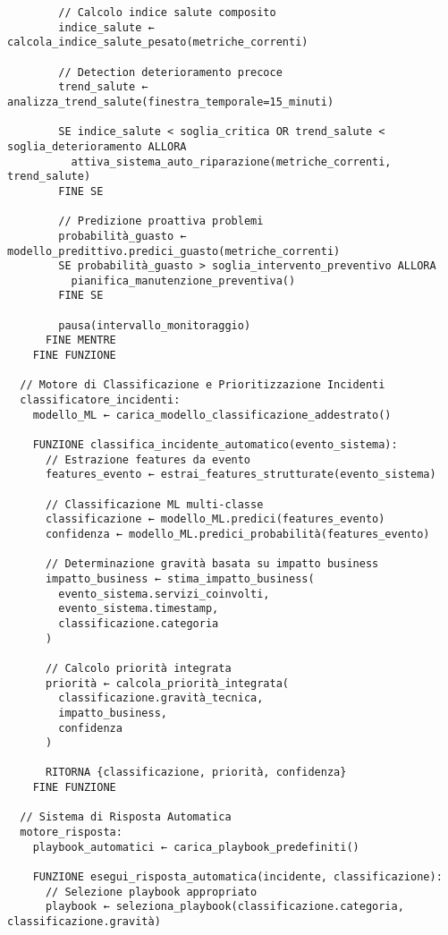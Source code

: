 {\begin{verbatim}
        // Calcolo indice salute composito
        indice_salute ← calcola_indice_salute_pesato(metriche_correnti)
        
        // Detection deterioramento precoce
        trend_salute ← analizza_trend_salute(finestra_temporale=15_minuti)
        
        SE indice_salute < soglia_critica OR trend_salute < soglia_deterioramento ALLORA
          attiva_sistema_auto_riparazione(metriche_correnti, trend_salute)
        FINE SE
        
        // Predizione proattiva problemi
        probabilità_guasto ← modello_predittivo.predici_guasto(metriche_correnti)
        SE probabilità_guasto > soglia_intervento_preventivo ALLORA
          pianifica_manutenzione_preventiva()
        FINE SE
        
        pausa(intervallo_monitoraggio)
      FINE MENTRE
    FINE FUNZIONE

  // Motore di Classificazione e Prioritizzazione Incidenti
  classificatore_incidenti:
    modello_ML ← carica_modello_classificazione_addestrato()
    
    FUNZIONE classifica_incidente_automatico(evento_sistema):
      // Estrazione features da evento
      features_evento ← estrai_features_strutturate(evento_sistema)
      
      // Classificazione ML multi-classe
      classificazione ← modello_ML.predici(features_evento)
      confidenza ← modello_ML.predici_probabilità(features_evento)
      
      // Determinazione gravità basata su impatto business
      impatto_business ← stima_impatto_business(
        evento_sistema.servizi_coinvolti,
        evento_sistema.timestamp,
        classificazione.categoria
      )
      
      // Calcolo priorità integrata
      priorità ← calcola_priorità_integrata(
        classificazione.gravità_tecnica,
        impatto_business,
        confidenza
      )
      
      RITORNA {classificazione, priorità, confidenza}
    FINE FUNZIONE

  // Sistema di Risposta Automatica
  motore_risposta:
    playbook_automatici ← carica_playbook_predefiniti()
    
    FUNZIONE esegui_risposta_automatica(incidente, classificazione):
      // Selezione playbook appropriato
      playbook ← seleziona_playbook(classificazione.categoria, classificazione.gravità)
      

\end{verbatim}}
